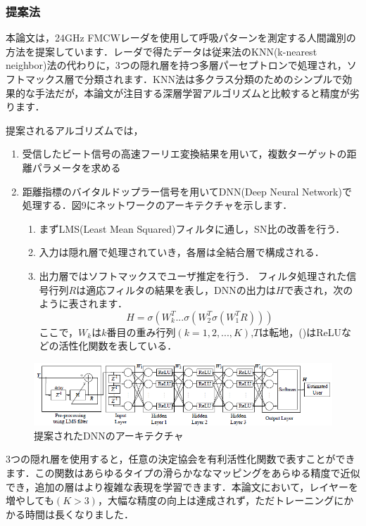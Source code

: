 \documentclass[dvipdfmx]{jsarticle}
\begin{document}
\subsubsection{提案法}
本論文は，24GHz FMCWレーダを使用して呼吸パターンを測定する人間識別の方法を提案しています．レーダで得たデータは従来法のKNN(k-nearest neighbor)法の代わりに，3つの隠れ層を持つ多層パーセプトロンで処理され，ソフトマックス層で分類されます．KNN法は多クラス分類のためのシンプルで効果的な手法だが，本論文が注目する深層学習アルゴリズムと比較すると精度が劣ります．

提案されるアルゴリズムでは，
\begin{enumerate}
    \item 受信したビート信号の高速フーリエ変換結果を用いて，複数ターゲットの距離パラメータを求める
    \item 距離指標のバイタルドップラー信号を用いてDNN(Deep Neural Network)で処理する．図9にネットワークのアーキテクチャを示します．
    \begin{enumerate}
        \item まずLMS(Least Mean Squared)フィルタに通し，SN比の改善を行う．
        \item 入力は隠れ層で処理されていき，各層は全結合層で構成される．
        \item 出力層ではソフトマックスでユーザ推定を行う．
        フィルタ処理された信号行列$R$は適応フィルタの結果を表し，DNNの出力は$H$で表され，次のように表されます．
\begin{equation}\label{}
    H = \sigma(W_k^T ... \sigma(W_2^T \sigma(W_1^T R)))
    \end{equation}
    ここで，$W_k$は$k$番目の重み行列$(k=1, 2, ..., K)$,$T$は転地，()はReLUなどの活性化関数を表している．
\end{enumerate}
\end{enumerate}

\begin{figure}[H]
    \begin{center}
    \includegraphics[width=0.9\linewidth]{./img/proposed_dnn.png}
    \end{center}
    \caption{提案されたDNNのアーキテクチャ}
\end{figure}

3つの隠れ層を使用すると，任意の決定協会を有利活性化関数で表すことができます．この関数はあらゆるタイプの滑らかななマッピングをあらゆる精度で近似でき，追加の層はより複雑な表現を学習できます．本論文において，レイヤーを増やしても$(K>3)$，大幅な精度の向上は達成されず，ただトレーニングにかかる時間は長くなりました．
\end{document}
